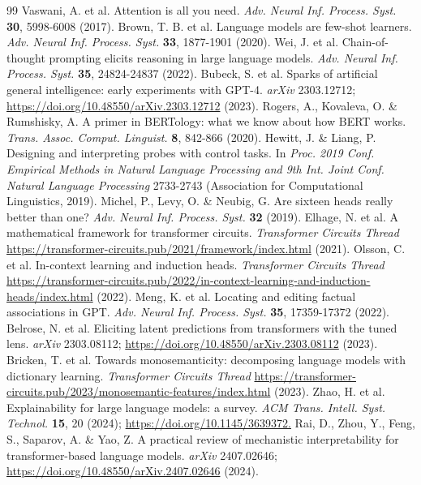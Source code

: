 \documentclass[11pt]{article}
\begin{document}
\clearpage
\begingroup\footnotesize
\setlength{\itemsep}{0pt}
\setlength{\parsep}{0pt}
\begin{thebibliography}{99}
 Vaswani, A. et al. Attention is all you need. \emph{Adv. Neural Inf. Process. Syst.} \textbf{30}, 5998-6008 (2017).
 Brown, T. B. et al. Language models are few-shot learners. \emph{Adv. Neural Inf. Process. Syst.} \textbf{33}, 1877-1901 (2020).
 Wei, J. et al. Chain-of-thought prompting elicits reasoning in large language models. \emph{Adv. Neural Inf. Process. Syst.} \textbf{35}, 24824-24837 (2022).
 Bubeck, S. et al. Sparks of artificial general intelligence: early experiments with GPT-4. \emph{arXiv} 2303.12712; \url{https://doi.org/10.48550/arXiv.2303.12712} (2023).
 Rogers, A., Kovaleva, O. \& Rumshisky, A. A primer in BERTology: what we know about how BERT works. \emph{Trans. Assoc. Comput. Linguist.} \textbf{8}, 842-866 (2020).
 Hewitt, J. \& Liang, P. Designing and interpreting probes with control tasks. In \emph{Proc. 2019 Conf. Empirical Methods in Natural Language Processing and 9th Int. Joint Conf. Natural Language Processing} 2733-2743 (Association for Computational Linguistics, 2019).
 Michel, P., Levy, O. \& Neubig, G. Are sixteen heads really better than one? \emph{Adv. Neural Inf. Process. Syst.} \textbf{32} (2019).
 Elhage, N. et al. A mathematical framework for transformer circuits. \emph{Transformer Circuits Thread} \url{https://transformer-circuits.pub/2021/framework/index.html} (2021).
 Olsson, C. et al. In-context learning and induction heads. \emph{Transformer Circuits Thread} \url{https://transformer-circuits.pub/2022/in-context-learning-and-induction-heads/index.html} (2022).
 Meng, K. et al. Locating and editing factual associations in GPT. \emph{Adv. Neural Inf. Process. Syst.} \textbf{35}, 17359-17372 (2022).
 Belrose, N. et al. Eliciting latent predictions from transformers with the tuned lens. \emph{arXiv} 2303.08112; \url{https://doi.org/10.48550/arXiv.2303.08112} (2023).
 Bricken, T. et al. Towards monosemanticity: decomposing language models with dictionary learning. \emph{Transformer Circuits Thread} \url{https://transformer-circuits.pub/2023/monosemantic-features/index.html} (2023).
 Zhao, H. et al. Explainability for large language models: a survey. \emph{ACM Trans. Intell. Syst. Technol.} \textbf{15}, 20 (2024); \url{https://doi.org/10.1145/3639372.}
 Rai, D., Zhou, Y., Feng, S., Saparov, A. \& Yao, Z. A practical review of mechanistic interpretability for transformer-based language models. \emph{arXiv} 2407.02646; \url{https://doi.org/10.48550/arXiv.2407.02646} (2024).

\end{thebibliography}
\end{document}
